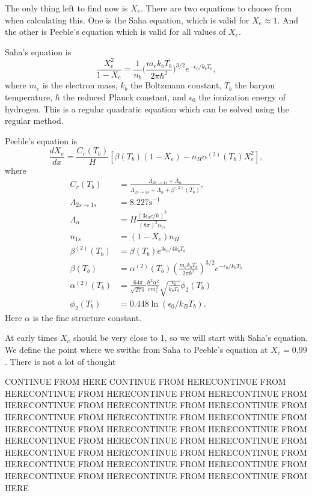\documentclass{aa}   %
\begin{document}
The only thing left to find now is $X_e$. There are two equations to choose from when calculating this.
One is the Saha equation, which is valid for $X_e \approx 1$. And the other is Peeble's equation which is valid for all values of $X_e$. 

Saha's equation is
\begin{equation}
 \frac{X_e^2}{1-X_e} = \frac{1}{n_b}\bigg(\frac{m_e k_b T_b}{2\pi \hbar^2}\bigg)^{3/2}e^{-\epsilon_0/k_b T_b},
\end{equation}
where $m_e$ is the electron mass, $k_b$ the Boltzmann constant, $T_b$ the baryon temperature, $\hbar$ the reduced Planck constant, and $\epsilon_0$ the ionization energy of hydrogen. This is a regular quadratic equation which can be solved using the regular method.

Peeble's equation is 
\begin{equation}
\frac{dX_e}{dx} = \frac{C_r(T_b)}{H} \left[\beta(T_b)(1-X_e) - n_H
  \alpha^{(2)}(T_b)X_e^2\right],
\end{equation}
where
\begin{align}
C_r(T_b) &= \frac{\Lambda_{2s\rightarrow1s} +	
  \Lambda_{\alpha}}{\Lambda_{2s\rightarrow1s} + \Lambda_{\alpha} +
  \beta^{(2)}(T_b)}, \\  
\Lambda_{2s\rightarrow1s} &= 8.227 \textrm{s}^{-1}\\
\Lambda_{\alpha} &= H\frac{(3\epsilon_0 c/\hbar)^3}{(8\pi)^2 n_{1s}}\\
n_{1s} &= (1-X_e)n_H \\
\beta^{(2)}(T_b) &= \beta(T_b) e^{3\epsilon_0/4k_b T_b} \\
\beta(T_b) &= \alpha^{(2)}(T_b) \left(\frac{m_e k_b T_b}{2\pi\hbar^2}
\right)^{3/2} e^{-\epsilon_0/k_b T_b} \\
\alpha^{(2)}(T_b) &= \frac{64\pi}{\sqrt{27\pi}}
\frac{\hbar^2 \alpha^2}{c m_e^2}\sqrt{\frac{\epsilon_0}{k_b T_b}}\phi_2(T_b)\\
\phi_2(T_b) &= 0.448\ln(\epsilon_0/k_B T_b).
\end{align}
Here $\alpha$ is the fine structure constant.

At early times $X_e$ should be very close to 1, so we will start with Saha's equation. We define the point where we swithc from Saha to Peeble's equation at $X_e = 0.99$. There is not a lot of thought 



CONTINUE FROM HERE
CONTINUE FROM HERECONTINUE FROM HERECONTINUE FROM HERECONTINUE FROM HERECONTINUE FROM HERECONTINUE FROM HERECONTINUE FROM HERECONTINUE FROM HERECONTINUE FROM HERECONTINUE FROM HERECONTINUE FROM HERECONTINUE FROM HERECONTINUE FROM HERECONTINUE FROM HERECONTINUE FROM HERECONTINUE FROM HERECONTINUE FROM HERECONTINUE FROM HERECONTINUE FROM HERECONTINUE FROM HERECONTINUE FROM HERECONTINUE FROM HERECONTINUE FROM HERECONTINUE FROM HERECONTINUE FROM HERECONTINUE FROM HERE
\end{document}
